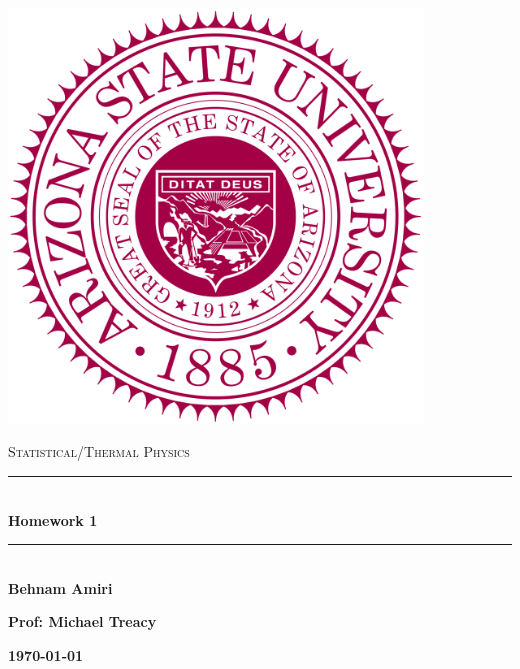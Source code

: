 \documentclass[fleqn]{article}
\begin{document}
  \begin{titlepage}

    \newcommand{\HRule}{\rule{\linewidth}{0.5mm}}

    \center

    \begin{center}
      \includegraphics[height=11cm, width=11cm]{asu.png}
    \end{center}

    \vline

    \textsc{\LARGE Statistical/Thermal Physics}\\[1.5cm]

    \HRule \\[0.5cm]
    { \huge \bfseries Homework 1}\\[0.4cm] 
    \HRule \\[1.0cm]

    \textbf{Behnam Amiri}

    \bigbreak

    \textbf{Prof: Michael Treacy}

    \bigbreak

    \textbf{{\large \today}\\[2cm]}

    \vfill

  \end{titlepage}
\end{document}
